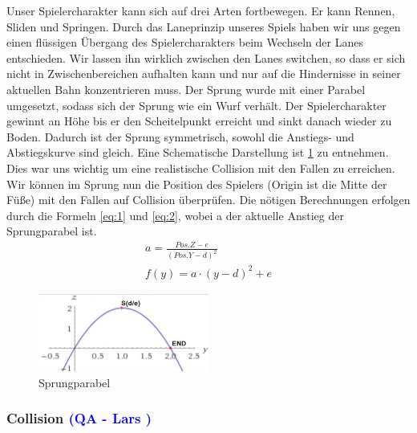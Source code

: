 \documentclass[12pt]{article}
\begin{document}
Unser Spielercharakter kann sich auf drei Arten fortbewegen. Er kann Rennen, Sliden und Springen. Durch das Laneprinzip unseres Spiels haben wir uns gegen einen flüssigen Übergang des Spielercharakters beim Wechseln der Lanes
entschieden. Wir lassen ihn wirklich zwischen den Lanes switchen, so dass er sich nicht in Zwischenbereichen aufhalten kann und nur auf die Hindernisse in seiner aktuellen Bahn konzentrieren muss. \newline
Der Sprung wurde mit einer Parabel umgesetzt, sodass sich der Sprung wie ein Wurf verhält. Der Spielercharakter gewinnt an Höhe bis er den Scheitelpunkt
erreicht und sinkt danach wieder zu Boden. Dadurch ist der Sprung symmetrisch, sowohl die Anstiegs- und Abstiegskurve sind gleich. Eine Schematische Darstellung ist \ref{fig:parabel} zu entnehmen. Dies war uns wichtig um eine realistische Collision mit den Fallen zu erreichen. Wir können im Sprung nun die Position des Spielers (Origin ist die Mitte der Füße) mit den Fallen auf Collision überprüfen. Die nötigen Berechnungen erfolgen durch die Formeln \ref{eq:1} und \ref{eq:2}, wobei a der aktuelle Anstieg der Sprungparabel ist.
\begin{align}
a = \frac{Pos.Z - e}{(Pos.Y - d)^{2}}  \label{eq:1} \\
f(y) = a \cdot (y - d)^{2} + e  \label{eq:2}
\end{align}

\begin{figure}[H]
	\centering
	\includegraphics[width=0.5\textwidth]{parabel}
	\caption{Sprungparabel
		\label{fig:parabel}}
\end{figure}

\vspace{1cm}
\subsubsection{Collision \textcolor{blue}{(QA - Lars )}}

\end{document}
